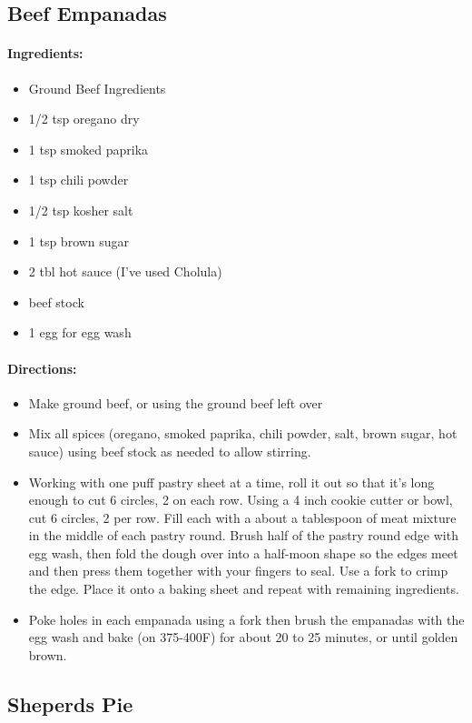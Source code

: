 \documentclass{article}
\begin{document}
\subsection{Beef Empanadas}
\paragraph{Ingredients:}
\begin{itemize}
  \item Ground Beef Ingredients
  \item 1/2 tsp oregano dry
  \item 1 tsp smoked paprika
  \item 1 tsp chili powder
  \item 1/2 tsp kosher salt
  \item 1 tsp brown sugar
  \item 2 tbl hot sauce (I’ve used Cholula)
  \item beef stock
  \item 1 egg for egg wash
\end{itemize}

\paragraph{Directions:}
\begin{itemize}
  \item Make ground beef, or using the ground beef left over
  \item Mix all spices (oregano, smoked paprika, chili powder, salt, brown sugar, hot sauce) using beef stock as needed to allow stirring.
  \item Working with one puff pastry sheet at a time, roll it out so that it’s long enough to cut 6 circles, 2 on each row. Using a 4 inch cookie cutter or bowl, cut 6 circles, 2 per row. Fill each with a about a tablespoon of meat mixture in the middle of each pastry round. Brush half of the pastry round edge with egg wash, then fold the dough over into a half-moon shape so the edges meet and then press them together with your fingers to seal. Use a fork to crimp the edge. Place it onto a baking sheet and repeat with remaining ingredients.
  \item Poke holes in each empanada using a fork then brush the empanadas with the egg wash and bake (on 375-400F) for about 20 to 25 minutes, or until golden brown.
\end{itemize}


\subsection{Sheperds Pie}
\end{document}
